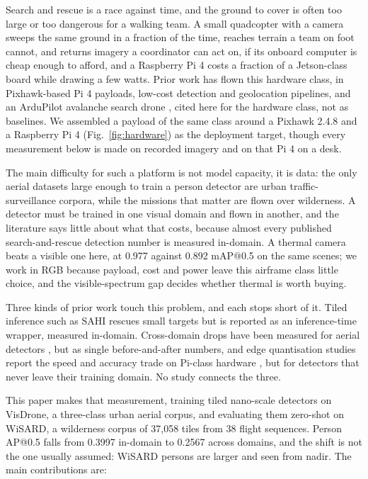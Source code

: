 \documentclass[conference]{IEEEtran}
\begin{document}
Search and rescue is a race against time, and the ground to cover is often too
large or too dangerous for a walking team. A small quadcopter with a camera
sweeps the same ground in a fraction of the time, reaches terrain a team on foot
cannot, and returns imagery a coordinator can act on, if its onboard computer is
cheap enough to afford, and a Raspberry Pi 4 costs a fraction of a Jetson-class
board while drawing a few watts. Prior work has flown this hardware class, in
Pixhawk-based Pi 4 payloads, low-cost detection and geolocation pipelines, and
an ArduPilot avalanche search drone \cite{elashaal2024,lago2024,stasik2025},
cited here for the hardware class, not as baselines. We assembled a payload of
the same class around a Pixhawk 2.4.8 and a Raspberry Pi 4
(Fig.~\ref{fig:hardware}) as the deployment target, though every measurement
below is made on recorded imagery and on that Pi 4 on a desk.

The main difficulty for such a platform is not model capacity, it is data: the
only aerial datasets large enough to train a person detector are urban
traffic-surveillance corpora, while the missions that matter are flown over
wilderness. A detector must be trained in one visual domain and flown in
another, and the literature says little about what that costs, because almost
every published search-and-rescue detection number is measured in-domain. A
thermal camera beats a visible one here, at 0.977 against 0.892 mAP@0.5 on the
same scenes; we work in RGB because payload, cost and power leave this airframe
class little choice, and the visible-spectrum gap decides whether thermal is
worth buying.

Three kinds of prior work touch this problem, and each stops short of it. Tiled
inference such as SAHI \cite{akyon2022} rescues small targets but is reported as
an inference-time wrapper, measured in-domain. Cross-domain drops have been
measured for aerial detectors \cite{chen2026,song2025,sambolek2024}, but as
single before-and-after numbers, and edge quantisation studies report the speed
and accuracy trade on Pi-class hardware \cite{ahn2023,rey2025}, but for
detectors that never leave their training domain. No study connects the three.

This paper makes that measurement, training tiled nano-scale detectors on
VisDrone, a three-class urban aerial corpus, and evaluating them zero-shot on
WiSARD, a wilderness corpus of 37,058 tiles from 38 flight sequences. Person
AP@0.5 falls from 0.3997 in-domain to 0.2567 across domains, and the shift is
not the one usually assumed: WiSARD persons are larger and seen from nadir. The
main contributions are:
\end{document}
